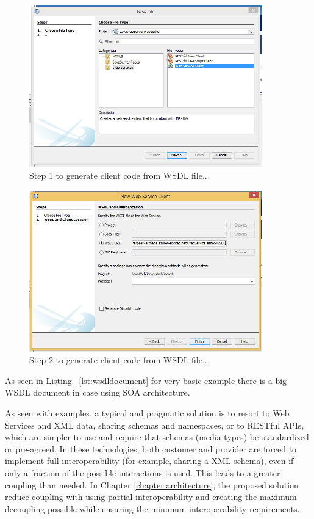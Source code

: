 \begin{figure}[!htb]
  \centering
  \includegraphics[width=0.9\textwidth]{Figures/client1.png}
  \caption[Step 1 to generate client code from WSDL file.]{Step 1 to generate client code from WSDL file..}
  \label{fig:wsdlstep1}
\end{figure}
\begin{figure}[!htb]
  \centering
  \includegraphics[width=0.9\textwidth]{Figures/client2.png}
  \caption[Step 2 to generate client code from WSDL file.]{Step 2 to generate client code from WSDL file..}
  \label{fig:wsdlstep2}
\end{figure}

As seen in Listing ~\ref{lst:wsdldocument} for very basic example there is a big WSDL document in case using SOA architecture.

As seen with examples, a typical and pragmatic solution is to resort to Web Services and XML data, sharing schemas and namespaces, or to RESTful APIs, which are simpler to use and require that schemas (media types) be standardized or pre-agreed. In these technologies, both customer and provider are forced to implement full interoperability (for example, sharing a XML schema), even if only a fraction of the possible interactions is used. This leads to a greater coupling than needed. In Chapter \ref{chapter:architecture}, the proposed solution  reduce coupling with using partial interoperability and creating the maximum decoupling possible while ensuring the minimum interoperability requirements.
